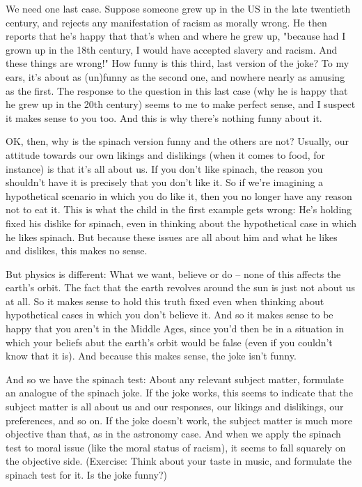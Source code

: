We need one last case. Suppose someone grew up in the US in the late 
twentieth century, and rejects any manifestation of racism as morally wrong. He then 
reports that he's happy that that's when and where he grew up, "because had I grown 
up in the 18th century, I would have accepted slavery and racism. And these things are 
wrong!" How funny is this third, last version of the joke? To my ears, it's about as 
(un)funny as the second one, and nowhere nearly as amusing as the first. The response 
to the question in this last case (why he is happy that he grew up in the 20th century) 
seems to me to make perfect sense, and I suspect it makes sense to you too. And this is 
why there's nothing funny about it.  

OK, then, why is the spinach version funny and the others are not? Usually, our 
attitude towards our own likings and dislikings (when it comes to food, for instance) is 
that it's all about us. If you don't like spinach, the reason you shouldn't have it is 
precisely that you don't like it. So if we're imagining a hypothetical scenario in which you 
do like it, then you no longer have any reason not to eat it. This is what the child in the 
first example gets wrong: He's holding fixed his dislike for spinach, even in thinking 
about the hypothetical case in which he likes spinach. But because these issues are all 
about him and what he likes and dislikes, this makes no sense.  

But physics is different: What we want, believe or do – none of this affects the 
earth’s orbit. The fact that the earth revolves around the sun is just not about us at all. 
So it makes sense to hold this truth fixed even when thinking about hypothetical cases 
in which you don't believe it. And so it makes sense to be happy that you aren’t in the 
Middle Ages, since you’d then be in a situation in which your beliefs abut the earth’s 
orbit would be false (even if you couldn’t know that it is). And because this makes sense, 
the joke isn't funny.  

And so we have the spinach test: About any relevant subject matter, formulate 
an analogue of the spinach joke. If the joke works, this seems to indicate that the 
subject matter is all about us and our responses, our likings and dislikings, our 
preferences, and so on. If the joke doesn't work, the subject matter is much more 
objective than that, as in the astronomy case. And when we apply the spinach test to 
moral issue (like the moral status of racism), it seems to fall squarely on the objective 
side.   
(Exercise: Think about your taste in music, and formulate the spinach test for it. Is the 
joke funny?) 
 
